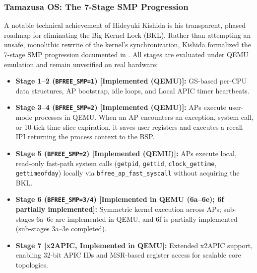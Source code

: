 \documentclass[10pt,journal,compsoc,twocolumn]{article}
\begin{document}
\subsubsection{Tamazusa OS: The 7-Stage SMP Progression}
A notable technical achievement of Hideyuki Kishida is his transparent, phased roadmap for eliminating the Big Kernel Lock (BKL). Rather than attempting an unsafe, monolithic rewrite of the kernel's synchronization, Kishida formalized the 7-stage SMP progression documented in . All stages are evaluated under QEMU emulation and remain unverified on real hardware:
\begin{itemize}[leftmargin=*]
    \item \textbf{Stage 1--2 (\texttt{BFREE\_SMP=1}) [Implemented (QEMU)]:} GS-based per-CPU data structures, AP bootstrap, idle loops, and Local APIC timer heartbeats.
    \item \textbf{Stage 3--4 (\texttt{BFREE\_SMP=2}) [Implemented (QEMU)]:} APs execute user-mode processes in QEMU. When an AP encounters an exception, system call, or 10-tick time slice expiration, it saves user registers and executes a recall IPI returning the process context to the BSP.
    \item \textbf{Stage 5 (\texttt{BFREE\_SMP=2}) [Implemented (QEMU)]:} APs execute local, read-only fast-path system calls (\texttt{getpid}, \texttt{gettid}, \texttt{clock\_gettime}, \texttt{gettimeofday}) locally via \texttt{bfree\_ap\_fast\_syscall} without acquiring the BKL.
    \item \textbf{Stage 6 (\texttt{BFREE\_SMP=3/4}) [Implemented in QEMU (6a--6e); 6f partially implemented]:} Symmetric kernel execution across APs; sub-stages 6a--6e are implemented in QEMU, and 6f is partially implemented (sub-stages 3a--3e completed).
    \item \textbf{Stage 7 [x2APIC, Implemented in QEMU]:} Extended x2APIC support, enabling 32-bit APIC IDs and MSR-based register access for scalable core topologies.
\end{itemize}
\end{document}
